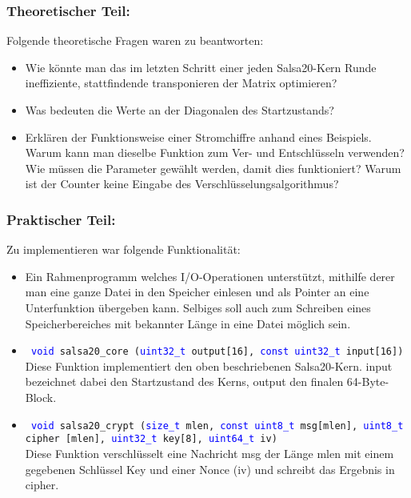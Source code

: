 \documentclass[course=erap]{aspdoc}
\begin{document}
\subsubsection{Theoretischer Teil:}
Folgende theoretische Fragen waren zu beantworten:
\begin{itemize}
    \item Wie könnte man das im letzten Schritt einer jeden Salsa20-Kern Runde ineffiziente, stattfindende transponieren der Matrix optimieren?
    \item Was bedeuten die Werte an der Diagonalen des Startzustands?
    \item Erklären der Funktionsweise einer Stromchiffre anhand eines Beispiels. Warum kann man dieselbe Funktion zum Ver- und Entschlüsseln verwenden? Wie müssen die Parameter gewählt werden, damit dies funktioniert? Warum ist der Counter keine Eingabe des Verschlüsselungsalgorithmus?
\end{itemize}

\subsubsection{Praktischer Teil:}
Zu implementieren  war folgende Funktionalität:
\begin{itemize}
    \item Ein Rahmenprogramm welches I/O-Operationen unterstützt, mithilfe derer man eine ganze Datei in den Speicher einlesen und als Pointer an eine Unterfunktion übergeben kann. Selbiges soll auch zum Schreiben eines Speicherbereiches mit bekannter Länge in eine Datei möglich sein.
    \item \texttt{ \textcolor{blue}{void} salsa20\_core (\textcolor{blue} {uint32\_t} output[16], \textcolor{blue}{const uint32\_t} input[16])} \\
    Diese Funktion implementiert den oben beschriebenen Salsa20-Kern. input bezeichnet dabei den Startzustand des Kerns, output den finalen 64-Byte-Block. \\
    \item \texttt{ \textcolor{blue} {void} salsa20\_crypt (\textcolor{blue}{size\_t} mlen, \textcolor{blue} {const uint8\_t} msg[mlen], \textcolor{blue}{uint8\_t} cipher [mlen], \textcolor{blue}{uint32\_t} key[8], \textcolor{blue} {uint64\_t} iv) }\\
    Diese Funktion verschlüsselt eine Nachricht msg der Länge mlen mit einem gegebenen Schlüssel Key und einer Nonce (iv) und schreibt das Ergebnis in cipher.
\end{itemize}
\end{document}
